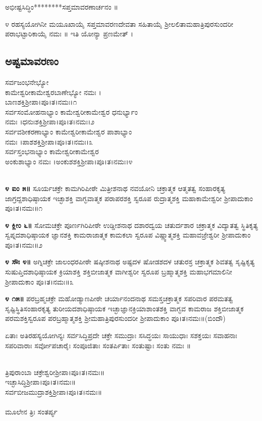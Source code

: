  ಅಭೀಷ್ಟಸಿದ್ಧಿಂ********ಸಪ್ತಮಾವರಣಾರ್ಚನಂ ॥

೪ ರಹಸ್ಯಯೋಗಿನೀ ಮಯೂಖಾಯೈ ಸಪ್ತಮಾವರಣದೇವತಾ ಸಹಿತಾಯೈ ಶ್ರೀಲಲಿತಾಮಹಾತ್ರಿಪುರಸುಂದರೀ ಪರಾಭಟ್ಟಾರಿಕಾಯೈ ನಮಃ ॥ ಇತಿ ಯೋನ್ಯಾ ಪ್ರಣಮೇತ್ ।
\subsection{ಅಷ್ಟಮಾವರಣಂ}
 ಸರ್ವಜಂಭನೇಭ್ಯೋ\\ ಕಾಮೇಶ್ವರೀಕಾಮೇಶ್ವರಬಾಣೇಭ್ಯೋ ನಮಃ ।\\ ಬಾಣಶಕ್ತಿಶ್ರೀಪಾ।ಪೂ।ತ।ನಮಃ।೧\\
 ಸರ್ವಸಂಮೋಹನಾಭ್ಯಾಂ ಕಾಮೇಶ್ವರೀಕಾಮೇಶ್ವರ ಧನುರ್ಭ್ಯಾಂ\\ ನಮಃ ।ಧನುಃಶಕ್ತಿಶ್ರೀಪಾ।ಪೂ।ತ।ನಮಃ।೨\\
 ಸರ್ವವಶೀಕರಣಾಭ್ಯಾಂ ಕಾಮೇಶ್ವರೀಕಾಮೇಶ್ವರ ಪಾಶಾಭ್ಯಾಂ\\ ನಮಃ ।ಪಾಶಶಕ್ತಿಶ್ರೀಪಾ।ಪೂ।ತ।ನಮಃ।೩\\
 ಸರ್ವಸ್ತಂಭನಾಭ್ಯಾಂ ಕಾಮೇಶ್ವರೀಕಾಮೇಶ್ವರ\\ಅಂಕುಶಾಭ್ಯಾಂ ನಮಃ ।ಅಂಕುಶಶಕ್ತಿಶ್ರೀಪಾ।ಪೂ।ತ।ನಮಃ।೪

\\
{\bfseries ೪ ಐಂ ೫॥} ಸೂರ್ಯಚಕ್ರೇ ಕಾಮಗಿರಿಪೀಠೇ ಮಿತ್ರೀಶನಾಥ ನವಯೋನಿ ಚಕ್ರಾತ್ಮಕ ಆತ್ಮತತ್ವ ಸಂಹಾರಕೃತ್ಯ ಜಾಗ್ರದ್ದಶಾಧಿಷ್ಠಾಯಕ ಇಚ್ಛಾಶಕ್ತಿ ವಾಗ್ಭವಾತ್ಮಕ ಪರಾಪರಶಕ್ತಿ ಸ್ವರೂಪ ರುದ್ರಾತ್ಮಶಕ್ತಿ ಮಹಾಕಾಮೇಶ್ವರೀ ಶ್ರೀಪಾದುಕಾಂ ಪೂ।ತ।ನಮಃ॥೧

{\bfseries೪ ಕ್ಲೀಂ ೬॥} ಸೋಮಚಕ್ರೇ ಪೂರ್ಣಗಿರಿಪೀಠೇ ಉಡ್ಡೀಶನಾಥ  ದಶಾರದ್ವಯ ಚತುರ್ದಶಾರ ಚಕ್ರಾತ್ಮಕ ವಿದ್ಯಾತತ್ವ ಸ್ಥಿತಿಕೃತ್ಯ ಸ್ವಪ್ನದಶಾಧಿಷ್ಠಾಯಕ ಜ್ಞಾನಶಕ್ತಿ ಕಾಮರಾಜಾತ್ಮಕ ಕಾಮಕಲಾ ಸ್ವರೂಪ ವಿಷ್ಣ್ವಾತ್ಮಶಕ್ತಿ ಮಹಾವಜ್ರೇಶ್ವರೀ ಶ್ರೀಪಾದುಕಾಂ ಪೂ।ತ।ನಮಃ॥೨

{\bfseries೪ ಸೌಃ ೪॥} ಅಗ್ನಿಚಕ್ರೇ ಜಾಲಂಧರಪೀಠೇ  ಷಷ್ಠೀಶನಾಥ ಅಷ್ಟದಳ ಷೋಡಶದಳ ಚತುರಸ್ರ ಚಕ್ರಾತ್ಮಕ ಶಿವತತ್ವ ಸೃಷ್ಟಿಕೃತ್ಯ ಸುಷುಪ್ತಿದಶಾಧಿಷ್ಠಾಯಕ ಕ್ರಿಯಾಶಕ್ತಿ ಶಕ್ತಿಬೀಜಾತ್ಮಕ ವಾಗೀಶ್ವರೀ ಸ್ವರೂಪ ಬ್ರಹ್ಮಾತ್ಮಶಕ್ತಿ  ಮಹಾಭಗಮಾಲಿನೀ ಶ್ರೀಪಾದುಕಾಂ ಪೂ।ತ।ನಮಃ॥೩

{\bfseries೪ ೧೫॥} ಪರಬ್ರಹ್ಮಚಕ್ರೇ ಮಹೋಡ್ಯಾಣಪೀಠೇ ಚರ್ಯಾನಂದನಾಥ ಸಮಸ್ತಚಕ್ರಾತ್ಮಕ ಸಪರಿವಾರ ಪರಮತತ್ವ ಸೃಷ್ಟಿಸ್ಥಿತಿಸಂಹಾರಕೃತ್ಯ ತುರೀಯದಶಾಧಿಷ್ಠಾಯಕ ಇಚ್ಛಾಜ್ಞಾನಕ್ರಿಯಾಶಾಂತಶಕ್ತಿ ವಾಗ್ಭವ ಕಾಮರಾಜ ಶಕ್ತಿಬೀಜಾತ್ಮಕ ಪರಮಶಕ್ತಿಸ್ವರೂಪ ಪರಬ್ರಹ್ಮಾತ್ಮಶಕ್ತಿ ಶ್ರೀಮಹಾತ್ರಿಪುರಸುಂದರೀ ಶ್ರೀಪಾದುಕಾಂ ಪೂ।ತ।ನಮಃ॥(ಬಿಂದೌ)

 ಏತಾಃ ಅತಿರಹಸ್ಯಯೋಗಿನ್ಯಃ ಸರ್ವಸಿದ್ಧಿಪ್ರದೇ ಚಕ್ರೇ ಸಮುದ್ರಾಃ ಸಸಿದ್ಧಯಃ ಸಾಯುಧಾಃ ಸಶಕ್ತಯಃ ಸವಾಹನಾಃ ಸಪರಿವಾರಾಃ ಸರ್ವೋಪಚಾರೈಃ ಸಂಪೂಜಿತಾಃ ಸಂತರ್ಪಿತಾಃ ಸಂತುಷ್ಟಾಃ ಸಂತು ನಮಃ ॥

\\ ತ್ರಿಪುರಾಂಬಾ ಚಕ್ರೇಶ್ವರೀಶ್ರೀಪಾ।ಪೂ।ತ।ನಮಃ॥\\
 ಇಚ್ಛಾಸಿದ್ಧಿಶ್ರೀಪಾ।ಪೂ।ತ।ನಮಃ॥\\
 ಸರ್ವಬೀಜಮುದ್ರಾಶಕ್ತಿಶ್ರೀಪಾ।ಪೂ।ತ।ನಮಃ॥\\
\\
ಮೂಲೇನ ತ್ರಿಃ ಸಂತರ್ಪ್ಯ
